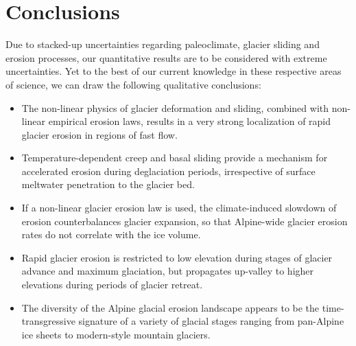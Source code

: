 \documentclass[utf8]{article}
\begin{document}
\section{Conclusions}

    Due to stacked-up uncertainties regarding paleoclimate, glacier sliding and
    erosion processes, our quantitative results are to be considered with extreme
    uncertainties. Yet to the best of our current knowledge in these respective
    areas of science, we can draw the following qualitative conclusions:
    \begin{itemize}
      \item The non-linear physics of glacier deformation and sliding, combined
        with non-linear empirical erosion laws, results in a very strong
        localization of rapid glacier erosion in regions of fast flow.
      \item Temperature-dependent creep and basal sliding provide a mechanism
        for accelerated erosion during deglaciation periods, irrespective of
        surface meltwater penetration to the glacier bed.
      \item If a non-linear glacier erosion law is used, the climate-induced
        slowdown of erosion counterbalances glacier expansion, so that
        Alpine-wide glacier erosion rates do not correlate with the ice volume.
      \item Rapid glacier erosion is restricted to low elevation during stages
        of glacier advance and maximum glaciation, but propagates up-valley to
        higher elevations during periods of glacier retreat.
      \item The diversity of the Alpine glacial erosion landscape appears to
        be the time-transgressive signature of a variety of glacial stages
        ranging from pan-Alpine ice sheets to modern-style mountain glaciers.
    \end{itemize}



\end{document}
